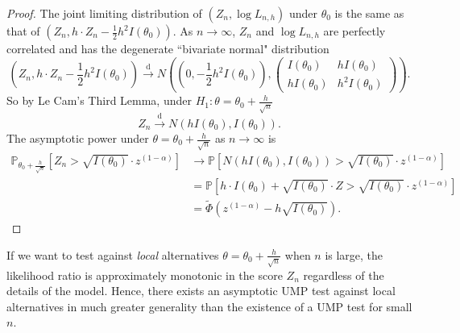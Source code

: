 \documentclass[a4paper]{article}
\begin{document}
\begin{itemize}[leftmargin=*]
	\begin{proof}
		The joint limiting distribution of $(Z_n,\log L_{n,h})$ under $\theta_0$ is the same as that of $\left(Z_n, h \cdot Z_n - \frac{1}{2}h^2I(\theta_0)\right)$. As $n \to \infty$, $Z_n$ and $\log L_{n,h}$ are perfectly correlated and has the degenerate ``bivariate normal" distribution 
		\begin{equation*}
			\left(Z_n, h \cdot Z_n - \frac{1}{2}h^2I(\theta_0)\right) \stackrel{\text{d}}{\longrightarrow} N \left( \left(0,- \frac{1}{2}h^2I(\theta_0)\right),
			\begin{pmatrix}
				I(\theta_0) & hI(\theta_0) \\
				hI(\theta_0) & h^2 I(\theta_0)
			\end{pmatrix}
			\right).
		\end{equation*}
		So by Le Cam's Third Lemma, under $H_1: \theta = \theta_0 + \frac{h}{\sqrt{n}}$
		\begin{equation*}
			Z_n \stackrel{\text{d}}{\longrightarrow} N(hI(\theta_0),I(\theta_0)).
		\end{equation*} 
		The asymptotic power under $\theta = \theta_0 + \frac{h}{\sqrt{n}}$ as $n \to \infty$ is
		\begin{equation*}
			\begin{aligned}
				\mathbb{P}_{\theta_0+\frac{h}{\sqrt{n}}} \left[Z_n > \sqrt{I(\theta_0)} \cdot z^{(1-\alpha)}\right] &\to \mathbb{P}\left[N(hI(\theta_0),I(\theta_0)) > \sqrt{I(\theta_0)} \cdot z^{(1-\alpha)}\right] \\
				&= \mathbb{P} \left[h \cdot I(\theta_0) + \sqrt{I(\theta_0)} \cdot Z > \sqrt{I(\theta_0)} \cdot z^{(1-\alpha)}\right] \\
				&= \tilde{\Phi}\left(z^{(1-\alpha)} - h \sqrt{I(\theta_0)} \right).
			\end{aligned}
		\end{equation*}
	\end{proof}

	\begin{note}
		If we want to test against \emph{local} alternatives $\theta = \theta_0 + \frac{h}{\sqrt{n}}$ when $n$ is large, the likelihood ratio is approximately monotonic in the score $Z_n$ regardless of the details of the model. Hence, there exists an asymptotic UMP test against local alternatives in much greater generality than the existence of a UMP test for small $n$.
	\end{note}


\end{itemize}
\end{document}
